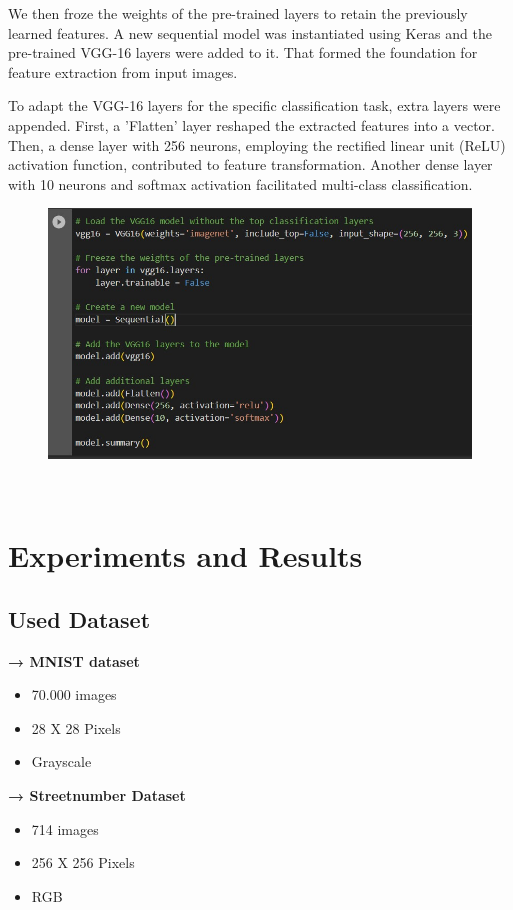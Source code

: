 \documentclass[12pt,a4paper]{article}
\begin{document}
We then froze the weights of the pre-trained layers to retain the previously learned features. A new sequential model was instantiated using Keras and the pre-trained VGG-16 layers were added to it. That formed the foundation for feature extraction from input images.

To adapt the VGG-16 layers for the specific classification task, extra layers were appended. First, a 'Flatten' layer reshaped the extracted features into a vector. Then, a dense layer with 256 neurons, employing the rectified linear unit (ReLU) activation function, contributed to feature transformation. Another dense layer with 10 neurons and softmax activation facilitated multi-class classification.

\begin{figure}[h]
    \centering
    \includegraphics[width=\linewidth]{images/Summary.jpeg}
     
     
     \caption{}     \label{fig:my_label} 
    \end{figure}\\

\section{Experiments and Results}
\subsection{Used Dataset}
\begin{multicols}{2}
\textbf{→ MNIST dataset}
\begin{itemize}
    \item 70.000 images
    \item 28 X 28 Pixels
    \item Grayscale
\end{itemize}
\linebreak
\newline
\textbf{→ Streetnumber Dataset}
\begin{itemize}
    \item 714 images
    \item 256 X 256 Pixels
    \item RGB
\end{itemize}
\end{multicols}
\end{document}
